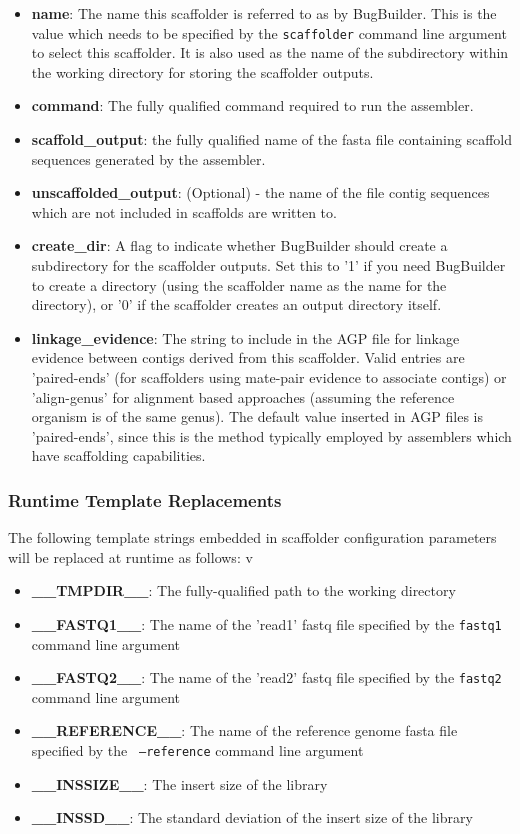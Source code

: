 \documentclass[a4paper,twoside,10pt]{article}
\begin{document}
\begin{itemize}
\item {\bf name}: The name this scaffolder is referred to as by BugBuilder. This is the value which
needs to be specified by the {\tt scaffolder} command line argument to select this scaffolder. It is
also used as the name of the subdirectory within the working directory for storing the scaffolder 
outputs.
\item {\bf command}: The fully qualified command required to run the assembler. 
\item {\bf scaffold\_output}:  the fully qualified name of the fasta file containing
scaffold sequences generated by the assembler.
\item {\bf unscaffolded\_output}: (Optional) - the name of the file contig sequences which are not
included in scaffolds are written to. 
\item {\bf create\_dir}: A flag to indicate whether BugBuilder should create a subdirectory for the
scaffolder outputs. Set this to '1' if you need BugBuilder to create a directory (using the
scaffolder name as the name for the directory), or '0' if the scaffolder creates an output
directory itself. 
\item {\bf linkage\_evidence}: The string to include in the AGP file for linkage evidence between
contigs derived from this scaffolder. Valid entries are 'paired-ends' (for scaffolders using
mate-pair evidence to associate contigs) or 'align-genus' for alignment based approaches (assuming
the reference organism is of the same genus). The default value inserted in AGP files is
'paired-ends', since this is the method typically employed by assemblers which have scaffolding
capabilities.
\end{itemize}

\subsubsection{Runtime Template Replacements}

The following template strings embedded in scaffolder configuration parameters will be replaced at runtime as
follows:
v
\begin{itemize}
\item {\bf \_\_TMPDIR\_\_}: The fully-qualified path to the working directory
\item {\bf \_\_FASTQ1\_\_}: The name of the 'read1' fastq file specified by the {\tt fastq1}
command line argument
\item {\bf \_\_FASTQ2\_\_}: The name of the 'read2' fastq file specified by the {\tt fastq2}
command line argument
\item {\bf \_\_REFERENCE\_\_}: The name of the reference genome fasta file specified by the {\tt
--reference} command line argument
\item {\bf \_\_INSSIZE\_\_}: The insert size of the library
\item {\bf \_\_INSSD\_\_}: The standard deviation of the insert size of the library
\end{itemize}
\end{document}
